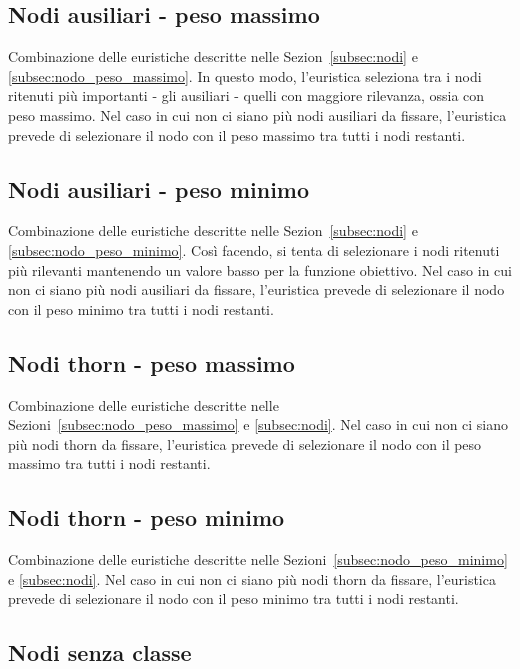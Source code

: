 \subsection{Nodi ausiliari - peso massimo}

Combinazione delle euristiche descritte nelle Sezion~\ref{subsec:nodi} e \ref{subsec:nodo_peso_massimo}. In questo modo, l'euristica seleziona tra i nodi ritenuti più importanti - gli ausiliari - quelli con maggiore rilevanza, ossia con peso massimo. Nel caso in cui non ci siano più nodi ausiliari da fissare, l'euristica prevede di selezionare il nodo con il peso massimo tra tutti i nodi restanti.

\subsection{Nodi ausiliari - peso minimo}

Combinazione delle euristiche descritte nelle Sezion~\ref{subsec:nodi} e \ref{subsec:nodo_peso_minimo}. Così facendo, si tenta di selezionare i nodi ritenuti più rilevanti mantenendo un valore basso per la funzione obiettivo. Nel caso in cui non ci siano più nodi ausiliari da fissare, l'euristica prevede di selezionare il nodo con il peso minimo tra tutti i nodi restanti.

\subsection{Nodi thorn - peso massimo}

Combinazione delle euristiche descritte nelle Sezioni~\ref{subsec:nodo_peso_massimo} e \ref{subsec:nodi}. Nel caso in cui non ci siano più nodi thorn da fissare, l'euristica prevede di selezionare il nodo con il peso massimo tra tutti i nodi restanti.

\subsection{Nodi thorn - peso minimo}

Combinazione delle euristiche descritte nelle Sezioni~\ref{subsec:nodo_peso_minimo} e \ref{subsec:nodi}. Nel caso in cui non ci siano più nodi thorn da fissare, l'euristica prevede di selezionare il nodo con il peso minimo tra tutti i nodi restanti.

\subsection{Nodi senza classe}\label{subsec:nodi_senza_classe}


